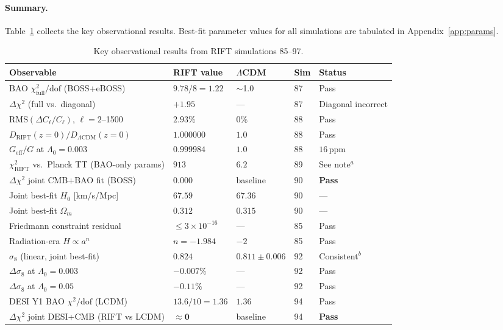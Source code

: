 \documentclass[12pt,a4paper]{article}
\begin{document}
\paragraph{Summary.} Table~\ref{tab:results_summary} collects the key
observational results. Best-fit parameter values for all simulations are
tabulated in Appendix~\ref{app:params}.

\begin{table}[ht]
\centering
\caption{Key observational results from RIFT simulations 85--97.}
\label{tab:results_summary}
\begin{tabular}{lllll}
\toprule
Observable & RIFT value & $\Lambda$CDM & Sim & Status \\
\midrule
BAO $\chi^2_{\mathrm{full}}/\mathrm{dof}$ (BOSS+eBOSS) & $9.78/8 = 1.22$ & $\sim$1.0 & 87 & Pass \\
$\Delta\chi^2$ (full vs.\ diagonal) & $+1.95$ & --- & 87 & Diagonal incorrect \\
$\mathrm{RMS}(\Delta C_\ell/C_\ell)$, $\ell=2$--1500 & $2.93\%$ & $0\%$ & 88 & Pass \\
$D_{\mathrm{RIFT}}(z=0)/D_{\Lambda\mathrm{CDM}}(z=0)$ & $1.000000$ & $1.0$ & 88 & Pass \\
$G_{\mathrm{eff}}/G$ at $\Lambda_0=0.003$ & $0.999984$ & $1.0$ & 88 & $16\,\mathrm{ppm}$ \\
$\chi^2_{\mathrm{RIFT}}$ vs.\ Planck TT (BAO-only params) & $913$ & $6.2$ & 89 & See note$^a$ \\
$\Delta\chi^2$ joint CMB+BAO fit (BOSS) & $\mathbf{0.000}$ & baseline & 90 & \textbf{Pass} \\
Joint best-fit $H_0$ [km/s/Mpc] & $67.59$ & $67.36$ & 90 & --- \\
Joint best-fit $\Omega_m$ & $0.312$ & $0.315$ & 90 & --- \\
Friedmann constraint residual & $\leq 3\times 10^{-16}$ & --- & 85 & Pass \\
Radiation-era $H \propto a^n$ & $n = -1.984$ & $-2$ & 85 & Pass \\
$\sigma_8$ (linear, joint best-fit) & $0.824$ & $0.811\pm 0.006$ & 92 & Consistent$^b$ \\
$\Delta\sigma_8$ at $\Lambda_0=0.003$ & $-0.007\%$ & --- & 92 & Pass \\
$\Delta\sigma_8$ at $\Lambda_0=0.05$ & $-0.11\%$ & --- & 92 & Pass \\
DESI Y1 BAO $\chi^2/\mathrm{dof}$ (LCDM) & $13.6/10 = 1.36$ & $1.36$ & 94 & Pass \\
$\Delta\chi^2$ joint DESI+CMB (RIFT vs LCDM) & $\mathbf{\approx 0}$ & baseline & 94 & \textbf{Pass} \\

\end{tabular}
\end{table}
\end{document}
